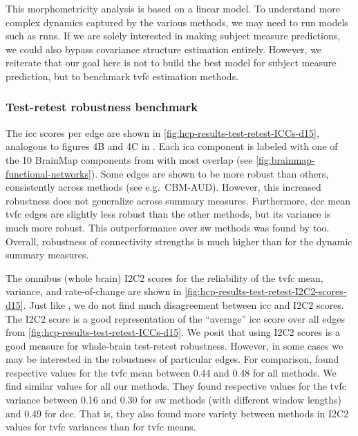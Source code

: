 This morphometricity analysis is based on a linear model.
To understand more complex dynamics captured by the various methods, we may need to run models such as \glspl{rnn}.
If we are solely interested in making subject measure predictions, we could also bypass covariance structure estimation entirely.
However, we reiterate that our goal here is not to build the best model for subject measure prediction, but to benchmark \gls{tvfc} estimation methods.

\subsubsection{Test-retest robustness benchmark}

The \gls{icc} scores per edge are shown in \cref{fig:hcp-results-test-retest-ICCs-d15}, analogous to figures 4B and 4C in \textcite{Choe2017}.
Each \gls{ica} component is labeled with one of the 10 BrainMap components from \textcite{Smith2009} with most overlap (see \cref{fig:brainmap-functional-networks}).
%
Some edges are shown to be more robust than others, consistently across methods (see e.g.~CBM-AUD).
However, this increased robustness does not generalize across summary measures.
Furthermore, \gls{dcc} mean \gls{tvfc} edges are slightly less robust than the other methods, but its variance is much more robust.
This outperformance over \gls{sw} methods was found by \textcite{Choe2017} too.
Overall, robustness of connectivity strengths is much higher than for the dynamic summary measures.

The omnibus (whole brain) I2C2 scores for the reliability of the \gls{tvfc} mean, variance, and rate-of-change are shown in \cref{fig:hcp-results-test-retest-I2C2-scores-d15}.
Just like \textcite{Choe2017}, we do not find much disagreement between \gls{icc} and I2C2 scores.
The I2C2 score is a good representation of the ``average'' \gls{icc} score over all edges from \cref{fig:hcp-results-test-retest-ICCs-d15}.
We posit that using I2C2 scores is a good measure for whole-brain test-retest robustness.
However, in some cases we may be interested in the robustness of particular edges.
For comparison, \textcite{Choe2017} found respective values for the \gls{tvfc} mean between 0.44 and 0.48 for all methods.
We find similar values for all our methods.
They found respective values for the \gls{tvfc} variance between 0.16 and 0.30 for \gls{sw} methods (with different window lengths) and 0.49 for \gls{dcc}.
That is, they also found more variety between methods in I2C2 values for \gls{tvfc} variances than for \gls{tvfc} means.



